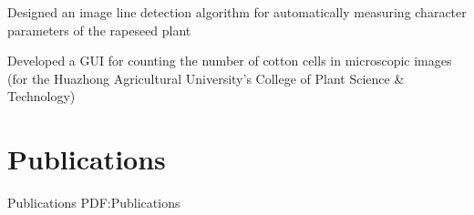 \documentclass[letterpaper,10pt,oneside]{article}
\begin{document}
\begin{body}
\GapNoBreak
\BulletItem
Designed an image line detection algorithm for automatically measuring character parameters of the rapeseed plant

\GapNoBreak
\BulletItem
Developed a GUI for counting the number of cotton cells in microscopic images (for the Huazhong Agricultural University's College of Plant Science \& Technology)







\section
{Publications}
{Publications}
{PDF:Publications}

\iffalse
\subsection
{Journals}
{Journals}
{PDF:Journals}

\GapNoBreak
\NumberedItem{[11]}
\href{http://www.example.com/my-paper-doi-5}
{\underline{J.~Doe}, J.~Citizen, and A.~Yone,
``On lasers and climate change,''
\textit{Journal of Science},
vol.~89,
no.~2,
pp.~4123--4133,
\DatestampYM{2008}{02}.}

\Gap
\NumberedItem{{\CharSpace}[1]}
\href{http://www.example.com/my-paper-doi-4}
{\underline{J.~Doe} and J.~Citizen,
``Measuring the extent of climate change,''
\textit{Global Scientific Journal},
vol.~12,
no.~4,
pp.~330--352,
\DatestampYM{2006}{12}.}
\fi



\end{body}
\end{document}
